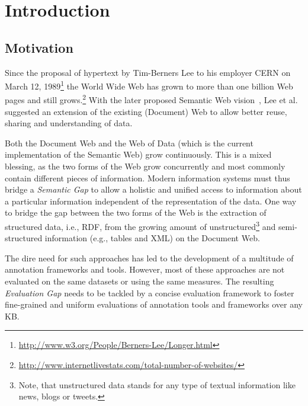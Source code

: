 \chapter{Introduction}

\section*{Motivation}

Since the proposal of hypertext by Tim-Berners Lee to his employer CERN on March 12, 1989\footnote{\url{http://www.w3.org/People/Berners-Lee/Longer.html}} the World Wide Web has grown to more than one billion Web pages and still grows.\footnote{\url{http://www.internetlivestats.com/total-number-of-websites/}}
With the later proposed Semantic Web vision~\cite{bernerslee2001semantic}, Lee et al. suggested an extension of the existing (Document) Web to allow better reuse, sharing and understanding of data.

Both the Document Web and the Web of Data (which is the current implementation of the Semantic Web) grow continuously. 
This is a mixed blessing, as the two forms of the Web grow concurrently and most commonly contain different pieces of information. 
Modern information systems must thus bridge a \emph{Semantic Gap} to allow a holistic and unified access to information about a particular information independent of the representation of the data.
One way to bridge the gap between the two forms of the Web is the extraction of structured data, i.e., RDF, from the growing amount of unstructured\footnote{Note, that unstructured data stands for any type of textual information like news, blogs or tweets.} and semi-structured information (e.g., tables and XML) on the Document Web.

The dire need for such approaches has led to the development of a multitude of annotation frameworks and tools. 
However, most of these approaches are not evaluated on the same datasets or using the same measures.
The resulting \emph{Evaluation Gap} needs to be tackled by a concise evaluation framework to foster fine-grained and uniform evaluations of annotation tools and frameworks over any \ac{KB}.

